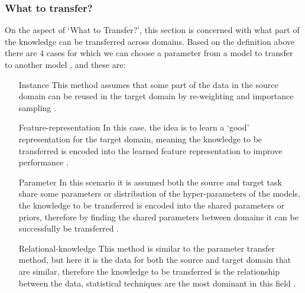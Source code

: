 \subsubsection{What to transfer?}
On the aspect of `What to Transfer?', this section is concerned with what part of the knowledge can be transferred across domains. Based on the definition above there are 4 cases for which we can choose a parameter from a model to transfer to another model \cite{Pan2010}, and these are:
\begin{itemize}
	\item[Instance ] This method assumes that some part of the data in the source domain can be reused in the target domain by re-weighting and importance sampling \cite{Pan2010,Xu2018,Cortes2007,Xia2013,Rohrbach2013,Zhang2010}.
	\item[Feature-representation] In this case, the idea is to learn a `good' representation for the target domain, meaning the knowledge to be transferred is encoded into the learned feature representation to improve performance \cite{Pan2010,Kandaswamy2014,Xia2013,Niu2021,Bahadori2014,Pan2008}. 
	\item[Parameter] In this scenario it is assumed both the source and target task share some parameters or distribution of the hyper-parameters of the models, the knowledge to be transferred is encoded into the shared parameters or priors, therefore by finding the shared parameters between domains it can be successfully be transferred \cite{Pan2010,Kumagai2016,Denil2013,Houlsby2019,Huang2010,Chapelle2000}.
	\item[Relational-knowledge] This method is similar to the parameter transfer method, but here  it is the data for both the source and target domain that are similar, therefore the knowledge to be transferred is the relationship between the data, statistical techniques are the most dominant in this field \cite{Pan2010,Niu2021,Yao2010,Tang2013,Rossi2018,Ramon2007}.
\end{itemize}

